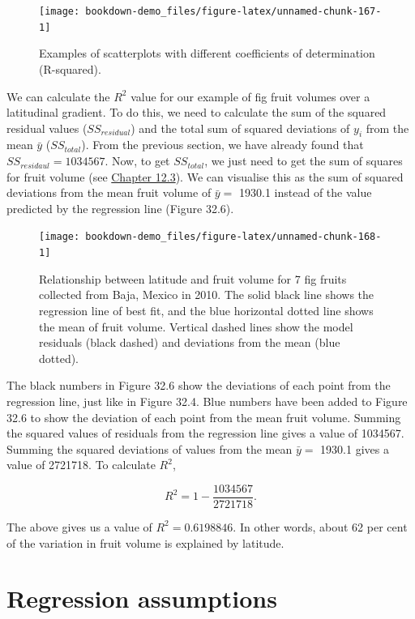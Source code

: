 \documentclass[
]{scrbook}
\begin{document}
\begin{figure}
\texttt{[image: bookdown-demo\_files/figure-latex/unnamed-chunk-167-1]} \caption{Examples of scatterplots with different coefficients of determination (R-squared).}\label{fig:unnamed-chunk-167}
\end{figure}

We can calculate the \(R^{2}\) value for our example of fig fruit volumes over a latitudinal gradient.
To do this, we need to calculate the sum of the squared residual values (\(SS_{residual}\)) and the total sum of squared deviations of \(y_{i}\) from the mean \(\bar{y}\) (\(SS_{total}\)).
From the previous section, we have already found that \(SS_{residaul} = 1034567\).
Now, to get \(SS_{total}\), we just need to get the sum of squares for fruit volume (see \protect\hyperlink{the-variance}{Chapter 12.3}).
We can visualise this as the sum of squared deviations from the mean fruit volume of \(\bar{y} =\) 1930.1 instead of the value predicted by the regression line (Figure 32.6).

\begin{figure}
\texttt{[image: bookdown-demo\_files/figure-latex/unnamed-chunk-168-1]} \caption{Relationship between latitude and fruit volume for 7 fig fruits collected from Baja, Mexico in 2010. The solid black line shows the regression line of best fit, and the blue horizontal dotted line shows the mean of fruit volume. Vertical dashed lines show the model residuals (black dashed) and deviations from the mean (blue dotted).}\label{fig:unnamed-chunk-168}
\end{figure}

The black numbers in Figure 32.6 show the deviations of each point from the regression line, just like in Figure 32.4.
Blue numbers have been added to Figure 32.6 to show the deviation of each point from the mean fruit volume.
Summing the squared values of residuals from the regression line gives a value of 1034567.
Summing the squared deviations of values from the mean \(\bar{y} =\) 1930.1 gives a value of 2721718.
To calculate \(R^{2}\),

\[R^{2} = 1 - \frac{1034567}{2721718}.\]

The above gives us a value of \(R^{2} = 0.6198846\).
In other words, about 62 per cent of the variation in fruit volume is explained by latitude.

\hypertarget{regression-assumptions}{%
\section{Regression assumptions}\label{regression-assumptions}}
\end{document}
